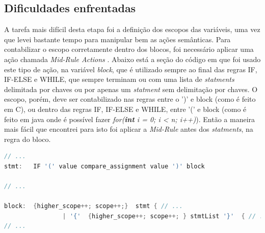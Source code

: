 \documentclass[12pt]{article}
\begin{document}
\subsection{Dificuldades enfrentadas}

\indent A tarefa mais difícil desta etapa foi a definição dos escopos das variáveis, uma vez que levei bastante tempo para manipular bem as ações semânticas. Para contabilizar o escopo corretamente dentro dos blocos, foi necessário aplicar uma ação chamada \textit{Mid-Rule Actions} \cite{gnuMidRule}. Abaixo está a seção do código em que foi usado este tipo de ação, na variável \textit{block}, que é utilizado sempre ao final das regras IF, IF-ELSE e WHILE, que sempre terminam ou com uma lista de \textit{statments} delimitada por chaves ou por apenas um \textit{statment} sem delimitação por chaves. O escopo, porém, deve ser contabilizado nas regras entre o ')' e block (como é feito em C), ou dentro das regras IF, IF-ELSE e WHILE, entre '(' e block (como é feito em java onde é possível fazer \textit{for(\textbf{int} i = 0; i < n; i++)}). Então a maneira mais fácil que encontrei para isto foi aplicar a \textit{Mid-Rule }antes dos \textit{statments}, na regra do bloco.\\

\begin{lstlisting}[language=C]
// ...
stmt:	IF '(' value compare_assignment value ')' block

// ...

block:  {higher_scope++; scope++;}  stmt { // ...
				| '{'  {higher_scope++; scope++; } stmtList '}'  { // ...
// ...
\end{lstlisting}



\end{document}
